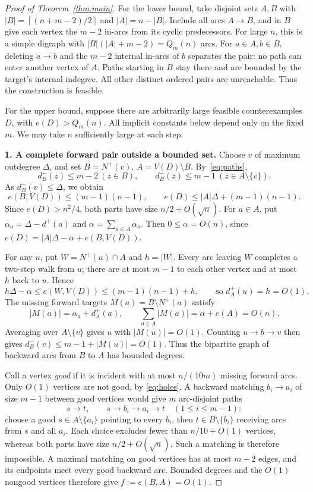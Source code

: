 \documentclass[11pt,a4paper]{amsart}
\newcommand{\cl}[1]{\left\lceil#1\right\rceil}
\newcommand{\ar}{\to}
\newcommand{\Q}{Q_m}
\begin{document}
\begin{proof}[Proof of Theorem~\ref{thm:main}]
For the lower bound, take disjoint sets $A,B$ with
$|B|=\cl{(n+m-2)/2}$ and $|A|=n-|B|$. Include all arcs $A\ar B$,
and in $B$ give each vertex the $m-2$ in-arcs from its cyclic
predecessors. For large $n$, this is a simple digraph with
$|B|(|A|+m-2)=\Q(n)$ arcs. For $a\in A,b\in B$, deleting $a\ar b$
and the $m-2$ internal in-arcs of $b$ separates the pair: no path can
enter another vertex of $A$. Paths starting in $B$ stay there and are
bounded by the target's internal indegree. All other distinct ordered
pairs are unreachable. Thus the construction is feasible.

For the upper bound, suppose there are arbitrarily large feasible
counterexamples $D$, with $e(D)>\Q(n)$. All implicit constants
below depend only on the fixed $m$. We may take $n$ sufficiently large
at each step.

\smallskip\noindent
\textbf{1. A complete forward pair outside a bounded set.}
Choose $v$ of maximum outdegree $\Delta$, and set
$B=N^+(v)$, $A=V(D)\setminus B$. By~\eqref{eq:paths},
\[
 d_B^-(z)\le m-2\ (z\in B),\qquad
 d_B^-(z)\le m-1\ (z\in A\setminus\{v\}).
\]
As $d_B^-(v)\le\Delta$, we obtain
\begin{equation}\label{eq:rough}
 e(B,V(D))\le(m-1)(n-1),\qquad
 e(D)\le |A|\Delta+(m-1)(n-1).
\end{equation}
Since $e(D)>n^2/4$, both parts have size $n/2+O(\sqrt n)$.
For $a\in A$, put $\alpha_a=\Delta-d^+(a)$ and
$\alpha=\sum_{a\in A}\alpha_a$. Then $0\le\alpha=O(n)$, since
$e(D)=|A|\Delta-\alpha+e(B,V(D))$.

For any $u$, put $W=N^+(u)\cap A$ and $h=|W|$.
Every arc leaving $W$ completes a two-step walk from $u$; there are at
most $m-1$ to each other vertex and at most $h$ back to $u$. Hence
\[
 h\Delta-\alpha\le e(W,V(D))\le(m-1)(n-1)+h,
 \qquad\text{so }d_A^+(u)=h=O(1).
\]
The missing forward targets $M(a)=B\setminus N^+(a)$ satisfy
\begin{equation}\label{eq:holes}
 |M(a)|=\alpha_a+d_A^+(a),\qquad
 \sum_{a\in A}|M(a)|=\alpha+e(A)=O(n).
\end{equation}
Averaging over $A\setminus\{v\}$ gives $u$ with $|M(u)|=O(1)$.
Counting $u\ar b\ar v$ then gives $d_B^-(v)\le m-1+|M(u)|=O(1)$.
Thus the bipartite graph of backward arcs from $B$ to $A$ has bounded degrees.

Call a vertex \emph{good} if it is incident with at most $n/(10m)$
missing forward arcs. Only $O(1)$ vertices are not good, by
\eqref{eq:holes}. A backward matching $b_i\ar a_i$ of size $m-1$
between good vertices would give $m$ arc-disjoint paths
\[
 s\ar t,\qquad s\ar b_i\ar a_i\ar t\quad(1\le i\le m-1):
\]
choose a good $s\in A\setminus\{a_i\}$ pointing to every $b_i$, then
$t\in B\setminus\{b_i\}$ receiving arcs from $s$ and all $a_i$.
Each choice excludes fewer than $n/10+O(1)$ vertices, whereas both parts
have size $n/2+O(\sqrt n)$. Such a matching is therefore impossible.
A maximal matching on good vertices has at most $m-2$ edges, and its
endpoints meet every good backward arc. Bounded degrees and the $O(1)$
nongood vertices therefore give $f:=e(B,A)=O(1)$.


\end{proof}
\end{document}
